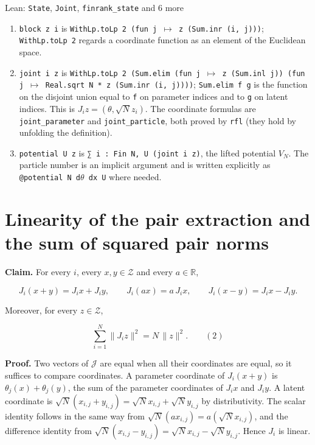 \documentclass[11pt,a4paper]{article}
\begin{document}
\begin{leanbox}{Lean: \texttt{State}, \texttt{Joint}, \texttt{finrank\_\allowbreak{}state} and 6 more}
\begin{enumerate}
\item \texttt{block z i} is \texttt{With\allowbreak{}Lp.\allowbreak{}to\allowbreak{}Lp 2 (fun j \ensuremath{\mapsto} z (Sum.\allowbreak{}inr (i, j)))}; \texttt{With\allowbreak{}Lp.\allowbreak{}to\allowbreak{}Lp 2} regards a coordinate function as an element of the Euclidean space.

\item \texttt{joint i z} is \texttt{With\allowbreak{}Lp.\allowbreak{}to\allowbreak{}Lp 2 (Sum.\allowbreak{}elim (fun j \ensuremath{\mapsto} z (Sum.\allowbreak{}inl j)) (fun j \ensuremath{\mapsto} Real.\allowbreak{}sqrt N * z (Sum.\allowbreak{}inr (i, j))))}; \texttt{Sum.\allowbreak{}elim f g} is the function on the disjoint union equal to \texttt{f} on parameter indices and to \texttt{g} on latent indices. This is \(J_iz=(\theta,\sqrt Nz_i)\). The coordinate formulas are \texttt{joint\_\allowbreak{}parameter} and \texttt{joint\_\allowbreak{}particle}, both proved by \texttt{rfl} (they hold by unfolding the definition).

\item \texttt{potential U z} is \texttt{∑ i : Fin N, U (joint i z)}, the lifted potential \(V_N\). The particle number is an implicit argument and is written explicitly as \texttt{@potential N d\ensuremath{\theta} dx U} where needed.

\end{enumerate}
\end{leanbox}

\section{\texorpdfstring{Linearity of the pair extraction and the sum of squared pair norms}{Linearity of the pair extraction and the sum of squared pair norms}}


\textbf{Claim.} For every \(i\), every \(x,y\in\mathcal Z\) and every \(a\in\mathbb R\),


\[J_i(x+y)=J_ix+J_iy,\qquad J_i(ax)=a\,J_ix,\qquad J_i(x-y)=J_ix-J_iy .\]


Moreover, for every \(z\in\mathcal Z\),


\[\sum_{i=1}^N\|J_iz\|^2=N\,\|z\|^2 .\qquad(2)\]


\textbf{Proof.} Two vectors of \(\mathcal J\) are equal when all their coordinates are equal, so it suffices to compare coordinates. A parameter coordinate of \(J_i(x+y)\) is \(\theta_j(x)+\theta_j(y)\), the sum of the parameter coordinates of \(J_ix\) and \(J_iy\). A latent coordinate is \(\sqrt N(x_{i,j}+y_{i,j})=\sqrt Nx_{i,j}+\sqrt Ny_{i,j}\) by distributivity. The scalar identity follows in the same way from \(\sqrt N(ax_{i,j})=a(\sqrt Nx_{i,j})\), and the difference identity from \(\sqrt N(x_{i,j}-y_{i,j})=\sqrt Nx_{i,j}-\sqrt Ny_{i,j}\). Hence \(J_i\) is linear.
\end{document}
